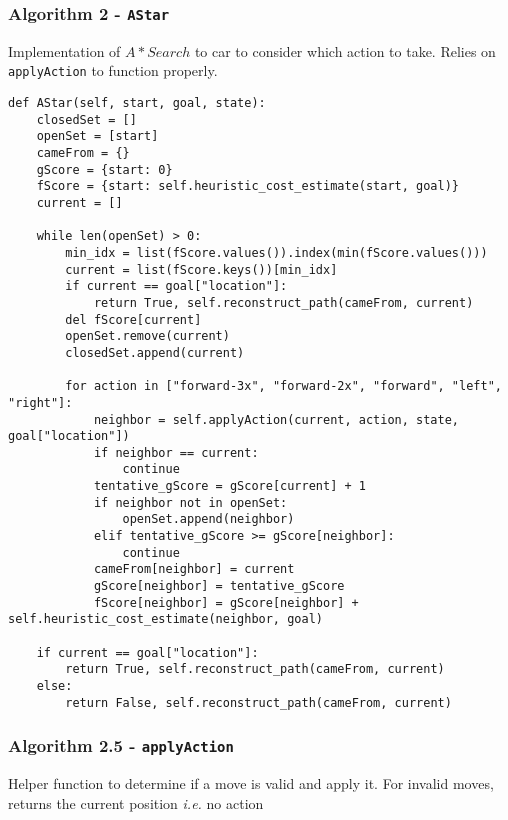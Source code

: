 \documentclass[12pt, letterpaper]{article}
\begin{document}
\subsubsection{Algorithm 2 - \texttt{AStar}}

Implementation of $A* Search$ to car to consider which action to take. Relies on \texttt{applyAction} to function properly.

\begin{mdframed}[backgroundcolor=shadecolor]
\begin{verbatim}
def AStar(self, start, goal, state):    
    closedSet = []
    openSet = [start]
    cameFrom = {}
    gScore = {start: 0}
    fScore = {start: self.heuristic_cost_estimate(start, goal)}
    current = []
    
    while len(openSet) > 0:
        min_idx = list(fScore.values()).index(min(fScore.values()))
        current = list(fScore.keys())[min_idx]
        if current == goal["location"]:
            return True, self.reconstruct_path(cameFrom, current)
        del fScore[current]
        openSet.remove(current)
        closedSet.append(current)
        
        for action in ["forward-3x", "forward-2x", "forward", "left", "right"]:
            neighbor = self.applyAction(current, action, state, goal["location"])
            if neighbor == current:
                continue
            tentative_gScore = gScore[current] + 1
            if neighbor not in openSet:
                openSet.append(neighbor)
            elif tentative_gScore >= gScore[neighbor]:
                continue
            cameFrom[neighbor] = current
            gScore[neighbor] = tentative_gScore
            fScore[neighbor] = gScore[neighbor] + self.heuristic_cost_estimate(neighbor, goal)
        
    if current == goal["location"]:
        return True, self.reconstruct_path(cameFrom, current)
    else:
        return False, self.reconstruct_path(cameFrom, current)
\end{verbatim}
\end{mdframed}

\subsubsection{Algorithm 2.5 - \texttt{applyAction}}

Helper function to determine if a move is valid and apply it. For invalid moves, returns the current position \textit{i.e.} no action
\end{document}

